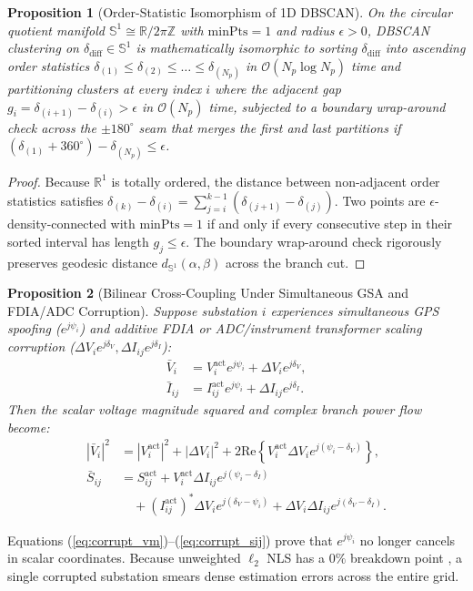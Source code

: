 \documentclass[journal,twoside]{IEEEtran}
\newtheorem{proposition}{Proposition}
\begin{document}
\begin{proposition}[Order-Statistic Isomorphism of 1D DBSCAN]
On the circular quotient manifold $\mathbb{S}^1 \cong \mathbb{R} / 2\pi\mathbb{Z}$ with $\mathrm{minPts} = 1$ and radius $\epsilon > 0$, DBSCAN clustering on $\delta_{\mathrm{diff}} \in \mathbb{S}^1$ is mathematically isomorphic to sorting $\delta_{\mathrm{diff}}$ into ascending order statistics $\delta_{(1)} \le \delta_{(2)} \le \dots \le \delta_{(N_p)}$ in $\mathcal{O}(N_p \log N_p)$ time and partitioning clusters at every index $i$ where the adjacent gap $g_i = \delta_{(i+1)} - \delta_{(i)} > \epsilon$ in $\mathcal{O}(N_p)$ time, subjected to a boundary wrap-around check across the $\pm 180^\circ$ seam that merges the first and last partitions if $(\delta_{(1)} + 360^\circ) - \delta_{(N_p)} \le \epsilon$.
\end{proposition}
\begin{proof}
Because $\mathbb{R}^1$ is totally ordered, the distance between non-adjacent order statistics satisfies $\delta_{(k)} - \delta_{(i)} = \sum_{j=i}^{k-1} (\delta_{(j+1)} - \delta_{(j)})$. Two points are $\epsilon$-density-connected with $\mathrm{minPts} = 1$ if and only if every consecutive step in their sorted interval has length $g_j \le \epsilon$. The boundary wrap-around check rigorously preserves geodesic distance $d_{\mathbb{S}^1}(\alpha, \beta)$ across the branch cut.
\end{proof}

\begin{proposition}[Bilinear Cross-Coupling Under Simultaneous GSA and FDIA/ADC Corruption]
Suppose substation $i$ experiences simultaneous GPS spoofing ($e^{j\psi_i}$) and additive FDIA or ADC/instrument transformer scaling corruption ($\Delta V_i e^{j\delta_V}, \Delta I_{ij} e^{j\delta_I}$):
\begin{equation}
\begin{aligned}
\bar{V}_i &= V_i^{\mathrm{act}} e^{j\psi_i} + \Delta V_i e^{j\delta_V}, \\
\bar{I}_{ij} &= I_{ij}^{\mathrm{act}} e^{j\psi_i} + \Delta I_{ij} e^{j\delta_I}.
\end{aligned}
\label{eq:combined_attack}
\end{equation}
Then the scalar voltage magnitude squared and complex branch power flow become:
\begin{align}
|\bar{V}_i|^2 &= |V_i^{\mathrm{act}}|^2 + |\Delta V_i|^2 + 2\mathrm{Re}\left\{V_i^{\mathrm{act}}\Delta V_i e^{j(\psi_i - \delta_V)}\right\}, \label{eq:corrupt_vm} \\
\bar{S}_{ij} &= S_{ij}^{\mathrm{act}} + V_i^{\mathrm{act}}\Delta I_{ij} e^{j(\psi_i - \delta_I)} \nonumber \\
&\quad + \left(I_{ij}^{\mathrm{act}}\right)^* \Delta V_i e^{j(\delta_V - \psi_i)} + \Delta V_i \Delta I_{ij} e^{j(\delta_V - \delta_I)}. \label{eq:corrupt_sij}
\end{align}
\end{proposition}
Equations (\ref{eq:corrupt_vm})--(\ref{eq:corrupt_sij}) prove that $e^{j\psi_i}$ no longer cancels in scalar coordinates. Because unweighted $\ell_2$ NLS has a $0\%$ breakdown point \cite{huber1981robust,gol2014lav}, a single corrupted substation smears dense estimation errors across the entire grid.
\end{document}
